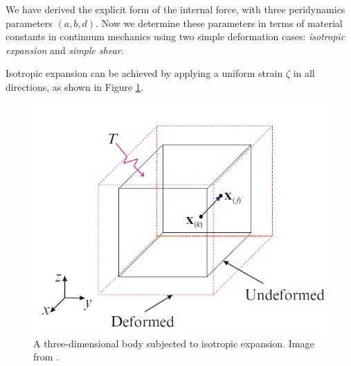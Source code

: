 \documentclass[11pt,fullpage]{article}
\newcommand{\blue}[1]{#1}
\begin{document}
We have derived the explicit form of the internal force, with three peridynamics parameters $(a,b,d)$. Now we determine these parameters in terms of material constants in continuum mechanics using two simple deformation cases: \emph{isotropic expansion} and \emph{simple shear}.


Isotropic expansion can be achieved by applying a uniform strain $\zeta$ in all directions, as shown in Figure \blue{\ref{fig:2}}.
\begin{figure}[h]
  \centering
  \includegraphics[width=0.5\linewidth]{./fig2.png}
  \caption{\label{fig:2}
  A three-dimensional body subjected to isotropic expansion. Image from \blue{\cite{madenci2014peridynamic}}.
}
\end{figure}
\end{document}
